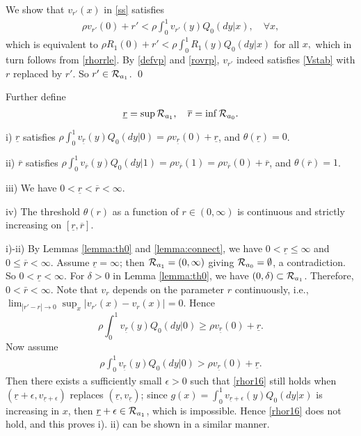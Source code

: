 \documentclass[graybox]{svmult}
\begin{document}
We  show that $v_{r'}(x)$ in \eqref{ss} satisfies
\begin{align}
\rho v_{r'}(0) +r' <\rho \int_0^1 v_{r'}(y) Q_0(dy|x), \quad \forall x,
\label{rovrp}
\end{align}
which is equivalent to
$
\rho R_1(0) +r' <\rho \int_0^1 R_1(y) Q_0(dy|x)$ for all $ x,
 $
which in turn follows from \eqref{rhorrle}.
By \eqref{defvp} and  \eqref{rovrp},  $v_{r'}$ indeed satisfies
\eqref{Vstab} with $r$ replaced by $r'$.  So $r'\in {\cal R}_{a_1}$. \qed



Further define
$$
\underline{r} =\sup {\cal R}_{a_1}, \quad \overline r= \inf  {\cal R}_{a_0}.
$$


\begin{lemma} \label{lemma:interv}
i) $\underline r$ satisfies
$\rho \int_0^1 v_{\underline r}(y) Q_0(dy|0) = \rho v_{\underline r}(0) +
\underline {r}$,
and $\theta(\underline r)=0$.

ii)
$\overline r$ satisfies
$\rho \int_0^1 v_{\overline r}(y) Q_0(dy|1) =\rho v_{\overline r}(1) = \rho v_{\overline r}(0) +
\overline {r}$,
and $\theta(\overline r)=1$.


iii)
We have  $0<\underline r<\overline r<\infty$.

iv) The threshold $\theta(r)$ as a function of $r\in (0, \infty)$ is continuous and strictly increasing on $[\underline r, \overline r]$.
\end{lemma}

\proof i)-ii) By Lemmas \ref{lemma:th0} and
\ref{lemma:connect}, we have
$ 0<\underline r\le \infty$ and $0\le  \overline r<\infty$.
Assume $\underline r=\infty$; then ${\cal R}_{a_1} =(0,\infty)$ giving
 ${\cal R}_{a_0}=\emptyset$, a contradiction. So $0<\underline r<\infty$.
For $\delta >0$ in Lemma \ref{lemma:th0}, we have $(0, \delta)\subset
{\cal R}_{a_1}$. Therefore, $0<\bar r <\infty$.
Note that $v_r$ depends on the parameter $r$ continuously, i.e.,
 $\lim_{|r'-r|\to 0}\sup_x|v_{r'}(x)-v_r(x)|=0$.
Hence
$$
\rho \int_0^1 v_{\underline r}(y) Q_0(dy|0) \ge  \rho
v_{\underline r}(0) +
\underline {r}.
$$
Now assume
\begin{align}
\rho \int_0^1 v_{\underline r}(y) Q_0(dy|0) >  \rho v_{\underline r}(0) +
\underline {r}. \label{rhor16}
\end{align}
Then there exists a sufficiently small $\epsilon>0$ such that \eqref{rhor16} still holds when
$(\underline r+\epsilon , v_{\underline r+\epsilon}   )$ replaces
$({\underline r} , v_{\underline r} )$; since $g(x)=\int_0^1
 v_{\underline r+\epsilon}(y) Q_0(dy|x) $ is increasing in $x$,  then $\underline r+\epsilon \in {\cal R}_{a_1}$, which is impossible. Hence \eqref{rhor16} does not hold, and this proves i). ii) can be shown in a similar manner.
\end{document}
